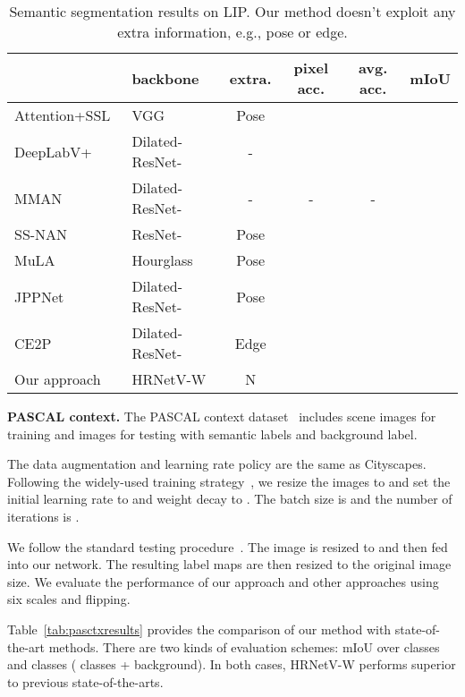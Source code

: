 \documentclass[10pt,twocolumn,letterpaper]{article}
\begin{document}
\renewcommand{\arraystretch}{1.3}
	\setlength{\tabcolsep}{2.8pt}
	\begin{table}[t]
	\scriptsize
	\centering
	\caption{Semantic segmentation results on LIP. Our method doesn't exploit
	any extra information, e.g., pose or edge. }
	\label{tab:lipresults}
	\begin{tabular}{l|lc|ccc}
		\hline
		\noalign{\smallskip}
		 & backbone & extra. & pixel acc. & avg. acc. & mIoU \\
		\hline
		
		\hline
		Attention+SSL~\cite{GongLSL17} & VGG & Pose &  &  &  \\
		DeepLabV+~\cite{ChenZPSA18} & Dilated-ResNet- & - &  &  &  \\
		MMAN~\cite{LuoZZGYY18} & Dilated-ResNet- & - & - & - &  \\
		SS-NAN~\cite{ZhaoLNZCWFY17} & ResNet- & Pose &  &  &  \\
		MuLA~\cite{NieFY18} & Hourglass & Pose &  &  &  \\
		JPPNet~\cite{XL18} & Dilated-ResNet- & Pose &  &  &  \\
		CE2P~\cite{TL18}  & Dilated-ResNet- & Edge &  &  &  \\
		\hline
		Our approach & HRNetV-W & N &  &  &  \\	
		\hline
	\end{tabular}
	 \vspace{-3mm}
	\end{table}
	
\vspace{.1cm}
\noindent\textbf{PASCAL context.}
The PASCAL context dataset~\cite{MottaghiCLCLFUY14}  includes  scene images for training and
 images for testing with  semantic labels and  background label.

The data augmentation and learning rate policy are the same as Cityscapes.
Following the widely-used training strategy~\cite{0005DSZWTA18, DingJSL018},
we resize the images to  and set the initial learning rate to 
and weight decay to . The batch size is  and the number of iterations is .

We follow the standard testing procedure~\cite{0005DSZWTA18, DingJSL018}.
The image is resized to 
and then fed into our network.
The resulting  label maps are then resized to the
original image size.
We evaluate the performance of our approach and other approaches
using six scales and flipping.


Table~\ref{tab:pasctxresults}
provides the comparison of our method
with state-of-the-art methods.
There are two kinds of evaluation schemes:
mIoU over  classes and  classes ( classes + background).
In both cases,
HRNetV-W performs superior to previous state-of-the-arts.
\end{document}
